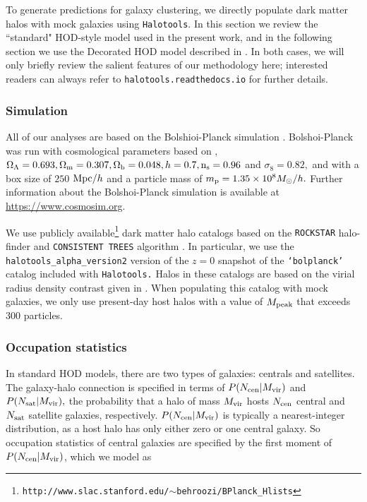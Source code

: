 \documentclass[usenatbib,usegraphicx,letterpaper]{mn2e}
\newcommand{\mvir}{M_{\rm vir}}
\newcommand{\ncen}{N_{\rm cen}}
\newcommand{\nsat}{N_{\rm sat}}
\begin{document}
To generate predictions for galaxy clustering, we directly populate dark matter halos with mock galaxies using {\tt Halotools}. In this section we review the ``standard" HOD-style model used in the present work, and in the following section we use the Decorated HOD model described in \citet{hearin_etal16}. In both cases, we will only briefly review the salient features of our methodology here; interested readers can always refer to {\tt halotools.readthedocs.io} for further details. 

\subsubsection{Simulation}
All of our analyses are based on the Bolshioi-Planck simulation \citep{riebe_etal11}. 
Bolshoi-Planck was run with cosmological parameters based on \citet{planck13}, $\Omega_{\Lambda} = 0.693, \Omega_{\rm m} = 0.307, \Omega_{\rm b} = 0.048, h = 0.7, {\rm n_s}=0.96$ and $\sigma_8 = 0.82,$ and with a box size of $250$ ${\rm Mpc}/h$ and a particle mass of $m_{\rm p} = 1.35\times10^{8}M_{\odot}/h.$ Further information about the Bolshoi-Planck simulation is available at \url{https://www.cosmosim.org}. 

We use publicly available\footnote{\tt http://www.slac.stanford.edu/$\sim$behroozi/BPlanck\_Hlists} dark matter halo catalogs based on the {\tt ROCKSTAR} halo-finder \citep{behroozi_rockstar11} and {\tt CONSISTENT TREES} algorithm \citep{behroozi_trees13}. In particular, we use the {\tt halotools\_alpha\_version2} version of the $z=0$ snapshot of the {\tt `bolplanck'} catalog included with {\tt Halotools.} Halos in these catalogs are based on the virial radius density contrast given in \citet{bryan_norman98}. When populating this catalog with mock galaxies, we only use present-day host halos with a value of $M_{\rm peak}$ that exceeds $300$ particles. 


\subsubsection{Occupation statistics}

In standard HOD models, there are two types of galaxies: centrals and satellites. The galaxy-halo connection is specified in terms of $P(\ncen|\mvir)$ and $P(\nsat|\mvir),$ the probability that a halo of mass $\mvir$ hosts $\ncen$ central and $\nsat$ satellite galaxies, respectively. $P(\ncen|\mvir)$ is typically a nearest-integer distribution, as a host halo has only either zero or one central galaxy. So occupation statistics of central galaxies are specified by the first moment of $P(\ncen|\mvir)$, which we model as 
\end{document}
